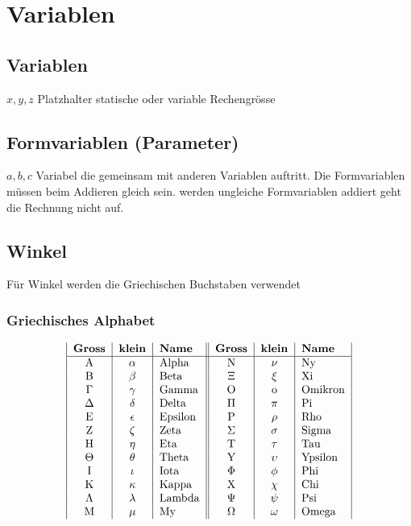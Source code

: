 \documentclass[a4paper]{scrartcl}
\begin{document}
\section{Variablen}
\subsection{Variablen}
$x,y,z$
\newline
\newline
Platzhalter statische oder variable Rechengrösse

\subsection{Formvariablen (Parameter)}
$a,b,c$
\newline\newline
Variabel die gemeinsam mit anderen Variablen auftritt. Die Formvariablen müssen beim Addieren gleich sein. werden ungleiche Formvariablen addiert geht die Rechnung nicht auf.
\newpage

\subsection{Winkel}
Für Winkel werden die Griechischen Buchstaben verwendet

\subsubsection{Griechisches Alphabet}
\begin{align}
\begin{tabular}{|c|c|l||c|c|l|}
\textbf{Gross} & \textbf{klein} & \textbf{Name} & \textbf{Gross} & \textbf{klein} & \textbf{Name} \\
\hline
A & $\alpha$ & Alpha & N & $\nu$ & Ny \\
B & $\beta$ & Beta & $\Xi$ & $\xi$ & Xi \\
$\Gamma$ & $\gamma$ & Gamma & O & o & Omikron \\
$\Delta$ & $\delta$ & Delta & $\Pi$ & $\pi$ & Pi \\
E & $\epsilon$ & Epsilon & P & $\rho$ & Rho \\
Z & $\zeta$ & Zeta & $\Sigma$ & $\sigma$ & Sigma \\
H & $\eta$ & Eta & T & $\tau$ & Tau \\
$\Theta$ & $\theta$ & Theta & Y & $\upsilon$ & Ypsilon \\
I & $\iota$ & Iota & $\Phi$ & $\phi$ & Phi \\
K & $\kappa$ & Kappa & X & $\chi$ & Chi \\
$\Lambda$ & $\lambda$ & Lambda & $\Psi$ & $\psi$ & Psi \\
M & $\mu$ & My & $\Omega$ & $\omega$ & Omega \\
\end{tabular}
\end{align}
\newline
\newpage
\end{document}
